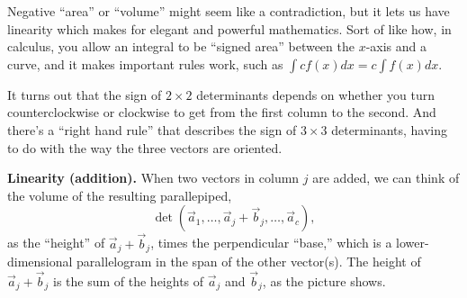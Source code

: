 \documentclass[11pt, letterpaper]{report}
\newenvironment{notes}{}{}
\begin{document}
Negative ``area'' or ``volume'' might seem like a contradiction, but it lets us have linearity which makes for elegant and powerful mathematics. Sort of like how, in calculus, you allow an integral to be ``signed area'' between the $x$-axis and a curve, and it makes important rules work, such as $\int c f(x)dx = c \int f(x)dx$.

It turns out that the sign of $2\times2$ determinants depends on whether you turn counterclockwise or clockwise to get from the first column to the second. And there's a ``right hand rule'' that describes the sign of $3\times3$ determinants, having to do with the way the three vectors are oriented.

\begin{notes}
\newpage
\end{notes}

\textbf{Linearity (addition).} When two vectors in column $j$ are added, we can think of the volume of the resulting parallepiped,
\[\det (\vec{a}_1, \ldots, \vec{a}_j + \vec{b}_j , \ldots , \vec{a}_c),\]
as the ``height'' of $\vec{a}_j + \vec{b}_j$, times the perpendicular ``base,'' which is a lower-dimensional parallelogram in the span of the other vector(s). The height of $\vec{a}_j + \vec{b}_j$ is the sum of the heights of $\vec{a}_j$ and $\vec{b}_j$, as the picture shows.
\end{document}
